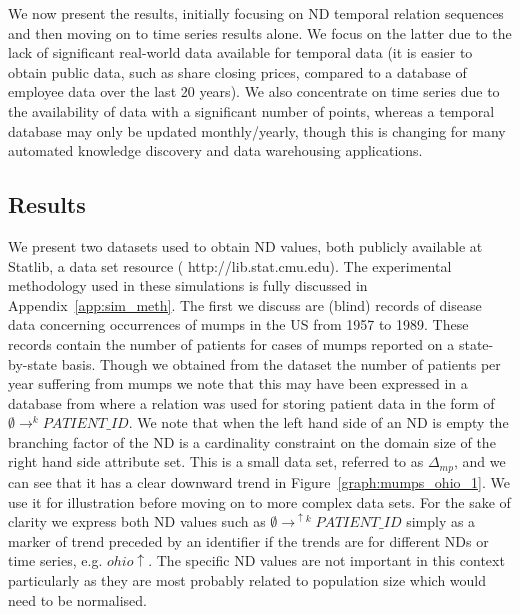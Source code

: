 We now present the results, initially focusing on ND temporal relation
sequences and
then moving on to time series results alone. We focus on the latter
due to the lack of significant real-world data available for temporal
data (it is easier to obtain public data, such as share closing prices,
compared to a database of employee data over the last 20 years). We
also concentrate on time series due to the availability of data with a
significant number of points, whereas a temporal database may only be
updated monthly/yearly, though this is changing for many automated
knowledge discovery and data warehousing applications.


\subsection{Results}\label{subsec:tr_relres}

We present two datasets used to obtain ND values, both publicly
available at Statlib, a data set resource (\ttb
http://lib.stat.cmu.edu\tte). The experimental methodology used in
these simulations is fully discussed in Appendix~\ref{app:sim_meth}.
The first we
discuss are (blind) records of disease data concerning occurrences of
mumps in the US from 1957 to 1989. These records contain the number of
patients for cases of mumps reported on a state-by-state
basis. Though we obtained from the dataset the number of patients
per year suffering from mumps we note that this may have been
expressed in a database from where a relation was used for storing
patient data in the form of $\emptyset \to^k PATIENT\_ID$. We note
that when the left hand side of an ND is empty the branching factor of
the ND is a cardinality constraint on the domain size of the right
hand side attribute set. This is a small data set, referred to as
$\Delta_{mp}$, and we can see that
it has a clear downward trend in Figure~\ref{graph:mumps_ohio_1}. We use it for
illustration before moving on to more complex data sets. For the sake
of clarity we express both ND values such as $\emptyset \to^{\uparrow
k} PATIENT\_ID$ 
simply as a marker of trend preceded by an identifier if the trends
are for different NDs or time series, e.g. $ohio\uparrow$. The
specific ND values are not important in this context particularly as
they are most probably related to population size which would need to
be normalised.
\medskip

